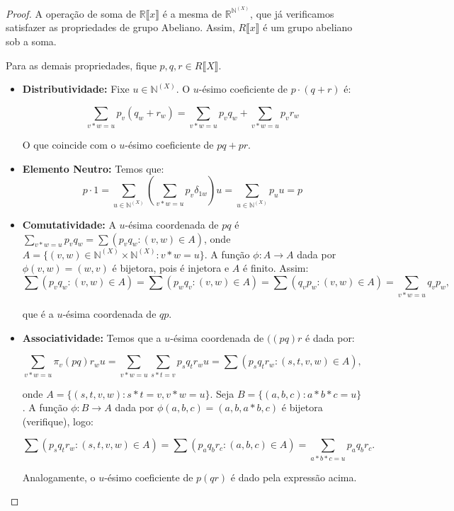 \begin{proof}
    A operação de soma de $\mathbb R\llbracket x \rrbracket$ é a mesma de $\mathbb R^{\mathbb N^{(X)}}$, que já verificamos satisfazer as propriedades de grupo Abeliano. Assim, $R\llbracket x \rrbracket$ é um grupo abeliano sob a soma.

    Para as demais propriedades, fique $p, q, r \in R\llbracket X \rrbracket$.
    \begin{itemize}
        \item \textbf{Distributividade:} Fixe $u \in \mathbb N^{(X)}$. O $u$-ésimo coeficiente de $p\cdot (q+r)$ é:
        
        \[\sum_{v*w=u} p_{v}(q_w+r_w)=\sum_{v*w=u}p_vq_w+\sum_{v*w=u}p_vr_w\]

        O que coincide com o $u$-ésimo coeficiente de $pq+pr$.
        \item \textbf{Elemento Neutro:} Temos que:
        \[p\cdot 1=\sum_{u \in \mathbb N^{(X)}}\left(\sum_{v*w=u} p_{v}\delta_{1w}\right)u=\sum_{u \in \mathbb N^{(X)}}p_{u}u=p\]

        \item \textbf{Comutatividade:} A $u$-ésima coordenada de $pq$ é $\sum_{v*w=u} p_vq_w=\sum(p_vq_w: (v, w)\in A)$, onde $A=\{(v, w)\in \mathbb N^{(X)}\times \mathbb N^{(X)}: v*w=u\}$. A função $\phi: A\rightarrow A$ dada por $\phi(v, w)=(w, v)$ é bijetora, pois é injetora e $A$ é finito. Assim:
        \[\sum(p_vq_w: (v, w)\in A)=\sum(p_wq_v: (v, w)\in A)=\sum(q_vp_w: (v, w)\in A)=\sum_{v*w=u}q_vp_w,\]

        que é a $u$-ésima coordenada de $qp$.
    
        \item \textbf{Associatividade:} Temos que a $u$-ésima coordenada de $((pq)r$ é dada por:

        \[\sum_{v*w=u}\pi_v(pq)r_wu=\sum_{v*w=u}\sum_{s*t=v}p_sq_tr_wu=\sum(p_sq_tr_w: (s, t, v, w)\in A),\]

        onde $A=\{(s, t, v, w): s*t=v, v*w=u\}$. Seja $B=\{(a, b, c): a*b*c=u\}$. A função $\phi:B\rightarrow A$ dada por $\phi(a, b, c)=(a, b, a*b, c)$ é bijetora (verifique), logo:

        \[\sum(p_sq_tr_w: (s, t, v, w)\in A)=\sum(p_aq_br_c: (a, b, c)\in A)=\sum_{a*b*c=u}p_aq_br_c.\]

        Analogamente, o $u$-ésimo coeficiente de $p(qr)$ é dado pela expressão acima.
    \end{itemize}
\end{proof}

